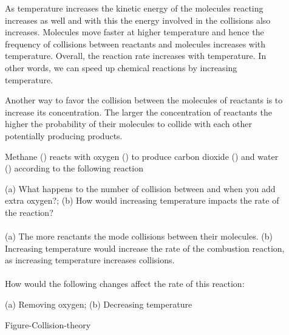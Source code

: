 \documentclass[main.tex]{subfiles}
\begin{document}
\begin{description}
\item[] 
As temperature increases the kinetic energy of the molecules reacting increases as well and with this the energy involved in the collisions also increases. Molecules move faster at higher temperature and hence the frequency of collisions between reactants and molecules increases with temperature. Overall, the reaction rate increases with temperature. In other words, we can speed up chemical reactions by increasing temperature.
\item[] 
Another way to favor the collision between the molecules of reactants is to increase its concentration. The larger the concentration of reactants the higher the probability of their molecules to collide with each other potentially producing products.

\begin{example} %
Methane () reacts with oxygen () to produce carbon dioxide () and water () according to the following reaction
\begin{center}\end{center}
(a) What happens to the number of collision between  and  when you add extra oxygen?; (b) How would increasing temperature impacts the rate of the reaction?\\
\\
(a) The more reactants the mode collisions between their molecules. (b) Increasing temperature would increase the rate of the combustion reaction, as increasing temperature increases collisions. 
\\
\faDiamond\ \\
How would the following changes affect the rate of this reaction:
\begin{center}\end{center}
 (a) Removing oxygen; (b) Decreasing temperature
\\
\end{example}%
\vspace{2cm}  {Figure-Collision-theory} \newpage


\end{description}
\end{document}
